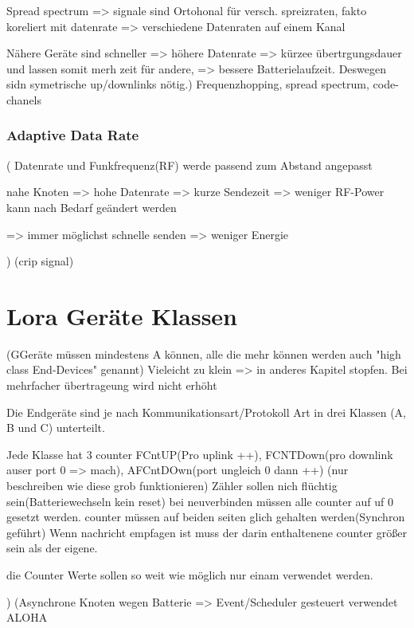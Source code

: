 \documentclass[a4paper,12pt]{article}
\begin{document}
            Spread spectrum => signale sind Ortohonal für versch. spreizraten, fakto koreliert mit datenrate => verschiedene Datenraten auf einem Kanal
            
            Nähere Geräte sind schneller => höhere Datenrate => kürzee übertrgungsdauer und lassen somit merh zeit für andere, => bessere Batterielaufzeit. Deswegen sidn symetrische up/downlinks nötig.)
            Frequenzhopping, spread spectrum, code-chanels
                \subsubsection{Adaptive Data Rate}
                \cite{LoraLimit}(
                    Datenrate und Funkfrequenz(RF) werde passend zum Abstand angepasst

                    nahe Knoten => hohe Datenrate => kurze Sendezeit => weniger RF-Power
                    kann nach Bedarf geändert werden

                    => immer möglichst schnelle senden => weniger Energie

                )
                \cite{LoraClasses}(crip signal)
    \section{Lora Geräte Klassen} \label{sec:klassen}
        \cite{LoRaSpec}(GGeräte müssen mindestens A können, alle die mehr können werden auch "high class End-Devices" genannt)
        Vieleicht zu klein => in anderes Kapitel stopfen. Bei mehrfacher übertrageung wird nicht erhöht

        Die Endgeräte sind je nach Kommunikationsart/Protokoll Art in drei Klassen (A, B und C) unterteilt. 
        
        Jede Klasse hat 3 counter FCntUP(Pro uplink ++), FCNTDown(pro downlink auser port 0 => mach), AFCntDOwn(port ungleich 0 dann ++)   (nur beschreiben wie diese grob funktionieren) Zähler sollen nich flüchtig sein(Batteriewechseln kein reset)
        bei neuverbinden müssen alle counter auf uf 0 gesetzt werden. counter müssen auf beiden seiten glich gehalten werden(Synchron geführt)
        Wenn nachricht empfagen ist muss der darin enthaltenene counter größer sein als der eigene. 

        die Counter Werte sollen so weit wie möglich nur einam verwendet werden.
        
        )
        \cite{LoraClasses}
        \cite{WhatIsLoRa}(Asynchrone Knoten wegen Batterie => Event/Scheduler gesteuert verwendet ALOHA
        
\end{document}

